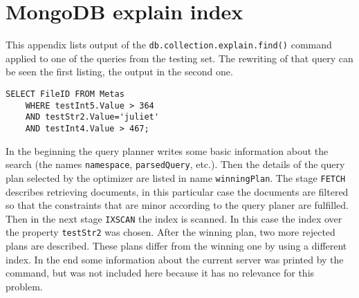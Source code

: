\chapter{MongoDB explain index} \label{app:MDB}

This appendix lists output of the \texttt{db.collection.explain.find()} command applied to 
one of the queries from the testing set. The rewriting of that query can be seen the first listing, the output
in the second one. 

\begin{verbatim}
SELECT FileID FROM Metas 
	WHERE testInt5.Value > 364 
	AND testStr2.Value='juliet' 
	AND testInt4.Value > 467;
\end{verbatim}

In the beginning the query planner writes some basic information about the search (the names \texttt{namespace},
\texttt{parsedQuery}, etc.). Then the details of the query plan selected by the optimizer are listed in name
\texttt{winningPlan}. The stage \texttt{FETCH} describes retrieving documents, in this particular case the documents
are filtered so that the constraints that are minor according to the query planer are fulfilled. Then in the next
stage \texttt{IXSCAN} the index is scanned. In this case the index over the property \texttt{testStr2} was chosen.
After the winning plan, two more rejected plans are described. These plans differ from the winning one by using a 
different index. In the end some information about the current server was printed by the command, but was not
included here because it has no relevance for this problem.

